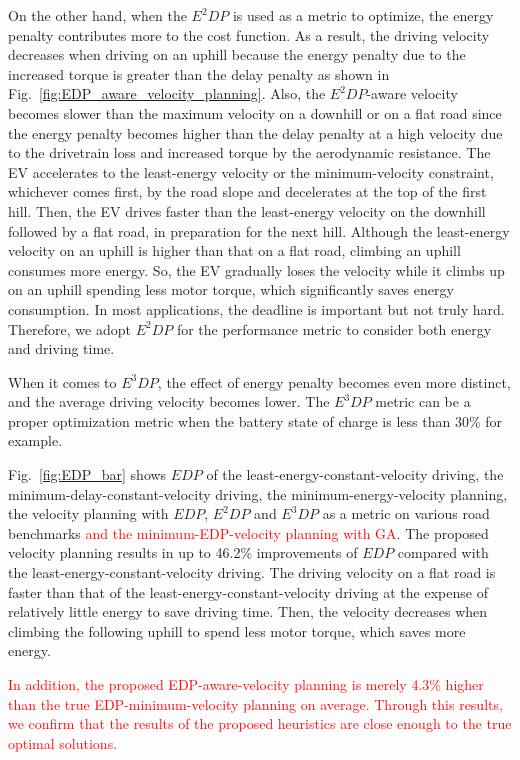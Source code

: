 \documentclass{IEEEtran}
\begin{document}
On the other hand, when the $E^2DP$ is used as a metric to optimize, the energy penalty contributes more to the cost function. As a result, the driving velocity decreases when driving on an uphill because the energy penalty due to the increased torque is greater than the delay penalty as shown in Fig.~\ref{fig:EDP_aware_velocity_planning}. Also, the $E^2DP$-aware velocity becomes slower than the maximum velocity on a downhill or on a flat road since the energy penalty becomes higher than the delay penalty at a high velocity due to the drivetrain loss and increased torque by the aerodynamic resistance. The EV accelerates to the least-energy velocity or the minimum-velocity constraint, whichever comes first, by the road slope and decelerates at the top of the first hill. Then, the EV drives faster than the least-energy velocity on the downhill followed by a  flat road, in preparation for the next hill. Although the least-energy velocity on an uphill is higher than that on a flat road, climbing an uphill consumes more energy. So, the EV gradually loses the velocity while it climbs up on an uphill spending less motor torque, which significantly saves energy consumption. In most applications, the deadline is important but not truly hard. Therefore, we adopt $E^2DP$ for the performance metric to consider both energy and driving time.

When it comes to $E^3DP$, the effect of energy penalty becomes even more distinct, and the average driving velocity becomes lower. 
The $E^3DP$ metric can be a proper optimization metric when the battery state of charge is less than 30\% for example.

Fig.~\ref{fig:EDP_bar} shows $EDP$ of the least-energy-constant-velocity driving, the minimum-delay-constant-velocity driving, the minimum-energy-velocity planning, the velocity planning with $EDP$, $E^2DP$ and $E^3DP$ as a metric on various road benchmarks \textcolor{red}{and the minimum-EDP-velocity planning with GA}. The proposed velocity planning results in up to 46.2\% improvements of $EDP$ compared with the least-energy-constant-velocity driving. 
The driving velocity on a flat road is faster than that of the least-energy-constant-velocity driving at the expense of relatively little energy to save driving time. Then, the velocity decreases when climbing the following uphill to spend less motor torque, which saves more energy.

\textcolor{red}{In addition, the proposed EDP-aware-velocity planning is merely 4.3\% higher than the true EDP-minimum-velocity planning on average. Through this results, we confirm that the results of the proposed heuristics are close enough to the true optimal solutions.}
\end{document}
